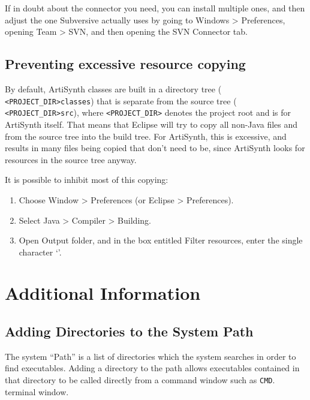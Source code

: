 If in doubt about the connector you need, you can install multiple
ones, and then adjust the one Subversive actually uses by going to
{\sf Windows > Preferences}, opening {\sf Team > SVN}, and then
opening the {\sf SVN Connector} tab.

\subsection{Preventing excessive resource copying}
\label{PreventingResourceCopying}

By default, ArtiSynth classes are built in a directory tree ({\tt
<PROJECT\_DIR>\SEP classes}) that is separate from the source tree ({\tt
<PROJECT\_DIR>\SEP src}), where {\tt <PROJECT\_DIR>} denotes the project
root \directory{} and is \ArtHome[] for ArtiSynth itself.
That means that Eclipse will try to copy all non-Java files and
\directories{} from the source tree into the build tree. For ArtiSynth,
this is excessive, and results in many files being copied that don't
need to be, since ArtiSynth looks for resources in the source tree
anyway.

It is possible to inhibit most of this copying:

\begin{enumerate}

\item Choose {\sf Window > Preferences} (or {\sf Eclipse > Preferences}).

\item Select {\sf Java > Compiler > Building}.

\item Open {\sf Output folder}, and in the box entitled {\sf Filter resources},
  enter the single character `{\tt *}'.

\end{enumerate}

\section{Additional Information}

\subsection{Adding Directories to the System Path}
\label{SettingPath}

The system ``Path'' is a list of directories which the system searches
in order to find executables. Adding a directory to the path allows
executables contained in that directory to be called directly from a
\ifWindows
command window such as {\tt CMD}.
\else
terminal window.
\fi

